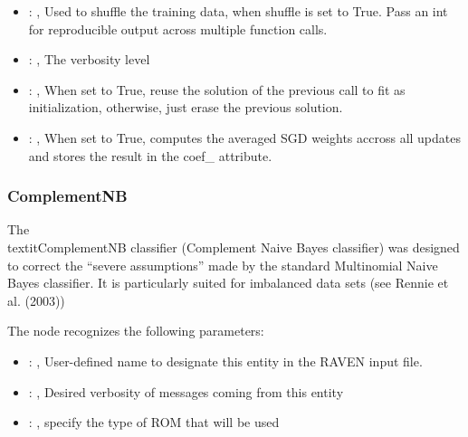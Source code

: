 \begin{itemize}
    \item {}: , 
      Used to shuffle the training data, when shuffle is set to
      True. Pass an int for reproducible output across multiple function calls.

    \item {}: , 
      The verbosity level

    \item {}: , 
      When set to True, reuse the solution of the previous call
      to fit as initialization, otherwise, just erase the previous solution.

    \item {}: , 
      When set to True, computes the averaged SGD weights accross
      all updates and stores the result in the coef\_ attribute.
  \end{itemize}


\subsubsection{ComplementNB}
  The \\textit{ComplementNB} classifier (Complement Naive Bayes classifier) was designed to correct
  the ``severe assumptions'' made by the standard Multinomial Naive Bayes classifier.
  It is particularly suited for imbalanced data sets (see Rennie et al. (2003))

  The  node recognizes the following parameters:
    \begin{itemize}
      \item {}: , 
        User-defined name to designate this entity in the RAVEN input file.
      \item {}: , 
        Desired verbosity of messages coming from this entity
      \item {}: , 
        specify the type of ROM that will be used
  \end{itemize}

